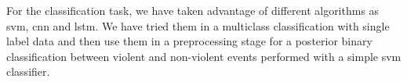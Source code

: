 	For the classification task, we have taken advantage of different algorithms as \acrshort{svm}, \acrshort{cnn} and \acrshort{lstm}. We have tried them in a multiclass classification with single label data and then use them in a preprocessing stage for a posterior binary classification between violent and non-violent events performed with a simple \acrshort{svm} classifier.
	
	